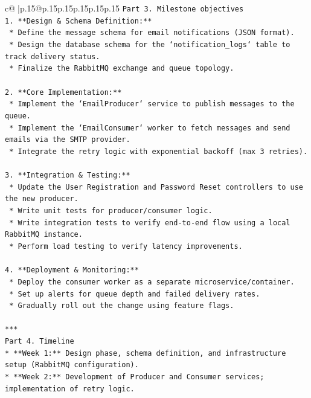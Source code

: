 \documentclass{article}
\begin{document}
{\begin{supertabular}{c@{$\;$}|p{.15\linewidth}@{}p{.15\linewidth}p{.15\linewidth}p{.15\linewidth}p{.15\linewidth}p{.15\linewidth}}
{{{\texttt{Part 3. Milestone objectives} \\
\texttt{1.  **Design \& Schema Definition:**} \\
\texttt{    *   Define the message schema for email notifications (JSON format).} \\
\texttt{    *   Design the database schema for the `notification\_logs` table to track delivery status.} \\
\texttt{    *   Finalize the RabbitMQ exchange and queue topology.} \\
\\ 
\texttt{2.  **Core Implementation:**} \\
\texttt{    *   Implement the `EmailProducer` service to publish messages to the queue.} \\
\texttt{    *   Implement the `EmailConsumer` worker to fetch messages and send emails via the SMTP provider.} \\
\texttt{    *   Integrate the retry logic with exponential backoff (max 3 retries).} \\
\\ 
\texttt{3.  **Integration \& Testing:**} \\
\texttt{    *   Update the User Registration and Password Reset controllers to use the new producer.} \\
\texttt{    *   Write unit tests for producer/consumer logic.} \\
\texttt{    *   Write integration tests to verify end{-}to{-}end flow using a local RabbitMQ instance.} \\
\texttt{    *   Perform load testing to verify latency improvements.} \\
\\ 
\texttt{4.  **Deployment \& Monitoring:**} \\
\texttt{    *   Deploy the consumer worker as a separate microservice/container.} \\
\texttt{    *   Set up alerts for queue depth and failed delivery rates.} \\
\texttt{    *   Gradually roll out the change using feature flags.} \\
\\ 
\texttt{***} \\
\texttt{Part 4. Timeline} \\
\texttt{*   **Week 1:** Design phase, schema definition, and infrastructure setup (RabbitMQ configuration).} \\
\texttt{*   **Week 2:** Development of Producer and Consumer services; implementation of retry logic.} \\
}}}
\end{supertabular}}
\end{document}
